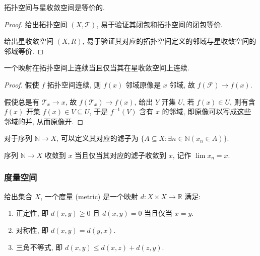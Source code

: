 \begin{theorem}
    拓扑空间与星收敛空间是等价的.

    \begin{proof}
        给出拓扑空间 \((X,\mathcal{T})\), 易于验证其闭包和拓扑空间的闭包等价.

        给出星收敛空间 \((X,R)\), 易于验证其对应的拓扑空间定义的邻域与星收敛空间的邻域等价.
    \end{proof}
\end{theorem}

\begin{theorem}
    一个映射在拓扑空间上连续当且仅当其在星收敛空间上连续.

    \begin{proof}
        假使 \(f\) 拓扑空间连续, 则 \(f (x)\) 邻域原像是 \(x\) 邻域, 故 \(f (\mathcal{F}) \to f(x)\).

        假使总是有 \(\mathcal{T}_x \to x\), 故 \(f (\mathcal{T}_x) \to f(x)\), 给出 \(Y\) 开集 \(U\),
        若 \(f (x) \in U\), 则有含 \(f(x)\) 开集 \(f(x) \in V \subseteq U\), 于是 \(f^{-1} (V)\) 含有 \(x\) 的邻域, 
        即原像可以写成这些邻域的并, 从而原像开.
    \end{proof}
\end{theorem}

\begin{definition}
    对于序列 \(\mathbb{N} \to X\), 可以定义其对应的滤子为 \(\{A \subseteq X : \exists n \in \mathbb{N} (x_n \in A)\}\).

    序列 \(\mathbb{N} \to X\) 收敛到 \(x\) 当且仅当其对应的滤子收敛到 \(x\), 记作 \(\lim x_n = x\).
\end{definition}

\subsubsection{度量空间}

\begin{definition}
    给出集合 \(X\), 一个度量 (metric) 是一个映射 \(d : X \times X \to \mathbb{R}\) 满足:

    \begin{enumerate}
        \item 正定性, 即 \(d(x,y) \geq 0\) 且 \(d(x,y) = 0\) 当且仅当 \(x = y\).
        \item 对称性, 即 \(d(x,y) = d(y,x)\).
        \item 三角不等式, 即 \(d(x,y) \leq d(x,z) + d(z,y)\).
    \end{enumerate}
\end{definition}

